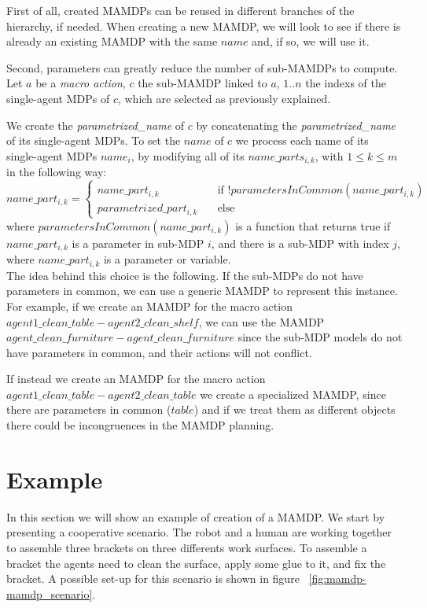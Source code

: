 First of all, created MAMDPs can be reused in different branches of the hierarchy, if needed. When creating a new MAMDP, we will look to see if there is already an existing MAMDP with the same $name$ and, if so, we will use it.

Second, parameters can greatly  reduce the number of sub-MAMDPs to compute. Let $a$ be a \textit{macro action}, $c$ the sub-MAMDP linked to $a$, $1..n$ the indexs of the single-agent MDPs of $c$, which are selected as previously explained.

 We create the \textit{parametrized\_name} of $c$ by concatenating the \textit{parametrized\_name} of its single-agent MDPs. To set the $name$ of  $c$ we process each name of its single-agent MDPs $name_i$, by modifying all of its $name\_parts_{i,k}$, with $1 \leq k \leq m$ in the following way:\\
$name\_part_{i,k}=
\begin{cases}
	name\_part_{i,k} & \quad \text{if } !parametersInCommon(name\_part_{i,k}) \\
	parametrized\_part_{i,k} & \quad \text{else}
\end{cases}$ \\
where $parametersInCommon(name\_part_{i,k})$ is a function that returns true if $name\_part_{i,k}$ is a parameter in sub-MDP $i$, and there is a sub-MDP with index $j$, where $name\_part_{i,k}$ is a parameter or variable. \\

The idea behind this choice is the following. If the sub-MDPs do not have parameters in common, we can use a generic MAMDP to represent this instance. For example, if we create an MAMDP for the macro action $agent1\_clean\_table-agent2\_clean\_shelf$, we can use the MAMDP $agent\_clean\_furniture-agent\_clean\_furniture$ since the sub-MDP models do not have parameters in common, and their actions will not conflict.

 If instead we create an MAMDP for the macro action $agent1\_clean\_table-agent2\_clean\_table$ we create a specialized MAMDP, since there are parameters in common ($table$) and if we treat them as different objects there could be incongruences in the MAMDP planning.



\section{Example}
\label{sec:mamdp-example}
In this section we will show an example of creation of a MAMDP. We start by presenting a cooperative scenario. The robot and a human are working together to assemble three brackets on three differents work surfaces. To assemble a bracket the agents need to clean the surface, apply some glue to it, and fix the bracket. A possible set-up for this scenario is shown in figure ~\ref{fig:mamdp-mamdp_scenario}.

